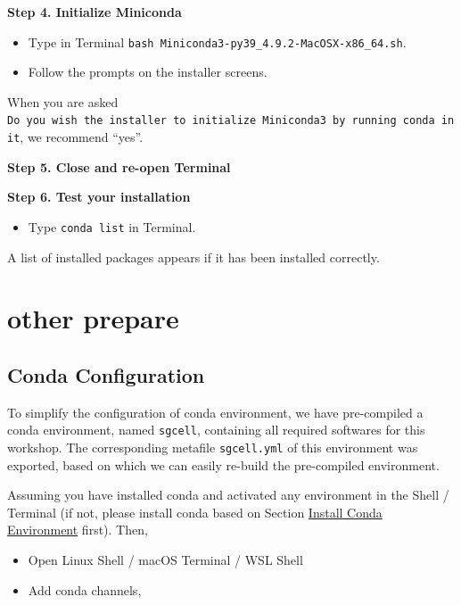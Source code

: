 \documentclass[
]{book}
\providecommand{\tightlist}{%
  \setlength{\itemsep}{0pt}\setlength{\parskip}{0pt}}
\begin{document}
\textbf{Step 4. Initialize Miniconda}

\begin{itemize}
\item
  Type in Terminal \texttt{bash\ Miniconda3-py39\_4.9.2-MacOSX-x86\_64.sh}.
\item
  Follow the prompts on the installer screens.
\end{itemize}

When you are asked \texttt{Do\ you\ wish\ the\ installer\ to\ initialize\ Miniconda3\ by\ running\ conda\ init}, we recommend ``yes''.

\textbf{Step 5. Close and re-open Terminal}

\textbf{Step 6. Test your installation}

\begin{itemize}
\tightlist
\item
  Type \texttt{conda\ list} in Terminal.
\end{itemize}

A list of installed packages appears if it has been installed correctly.

\hypertarget{other-prepare}{%
\section{other prepare}\label{other-prepare}}

\hypertarget{conda-configuration}{%
\subsection{Conda Configuration}\label{conda-configuration}}

To simplify the configuration of conda environment, we have pre-compiled a conda environment, named \texttt{sgcell}, containing all required softwares for this workshop. The corresponding metafile \texttt{sgcell.yml} of this environment was exported, based on which we can easily re-build the pre-compiled environment.

Assuming you have installed conda and activated any environment in the Shell / Terminal (if not, please install conda based on Section \protect\hyperlink{conda_install}{Install Conda Environment} first). Then,

\begin{itemize}
\item
  Open Linux Shell / macOS Terminal / WSL Shell
\item
  Add conda channels,
\end{itemize}
\end{document}
